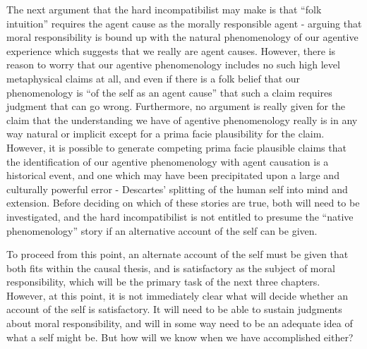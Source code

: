 \documentclass[phd,12pt,oneside,paper=letterpaper]{ubcthesis}
\begin{document}
The next argument that the hard incompatibilist may make is that ``folk intuition'' requires the agent cause as the morally responsible agent - arguing that moral responsibility is bound up with the natural phenomenology of our agentive experience which suggests that we really are agent causes. However, there is reason to worry that our agentive phenomenology includes no such high level metaphysical claims at all, and even if there is a folk belief that our phenomenology is ``of the self as an agent cause'' that such a claim requires judgment that can go wrong. Furthermore, no argument is really given for the claim that the understanding we have of agentive phenomenology really is in any way natural or implicit except for a prima facie plausibility for the claim. However, it is possible to generate competing prima facie plausible claims that the identification of our agentive phenomenology with agent causation is a historical event, and one which may have been precipitated upon a large and culturally powerful error - Descartes' splitting of the human self into mind and extension. Before deciding on which of these stories are true, both will need to be investigated, and the hard incompatibilist is not entitled to presume the ``native phenomenology'' story if an alternative account of the self can be given. 

To proceed from this point, an alternate account of the self must be given that both fits within the causal thesis, and is satisfactory as the subject of moral responsibility, which will be the primary task of the next three chapters. However, at this point, it is not immediately clear what will decide whether an account of the self is satisfactory. It will need to be able to sustain judgments about moral responsibility, and will in some way need to be an adequate idea of what a self might be. But how will we know when we have accomplished either? 
\end{document}
